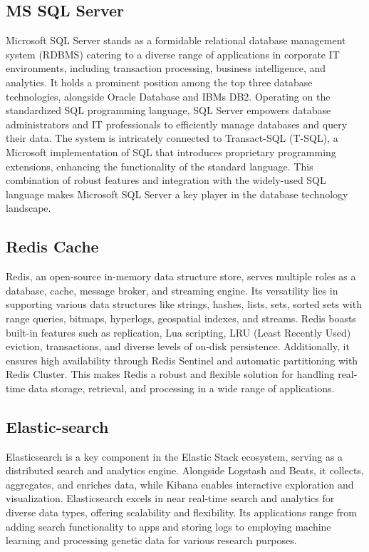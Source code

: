 \subsection{MS SQL Server}

Microsoft SQL Server stands as a formidable relational database
management system (RDBMS) catering to a diverse range of applications in
corporate IT environments, including transaction processing, business
intelligence, and analytics. It holds a prominent position among the top
three database technologies, alongside Oracle Database and
IBM\textquotesingle s DB2. Operating on the standardized SQL programming
language, SQL Server empowers database administrators and IT
professionals to efficiently manage databases and query their data. The
system is intricately connected to Transact-SQL (T-SQL), a Microsoft
implementation of SQL that introduces proprietary programming
extensions, enhancing the functionality of the standard language. This
combination of robust features and integration with the widely-used SQL
language makes Microsoft SQL Server a key player in the database
technology landscape.


\subsection{Redis Cache}

Redis, an open-source in-memory data structure store, serves multiple
roles as a database, cache, message broker, and streaming engine. Its
versatility lies in supporting various data structures like strings,
hashes, lists, sets, sorted sets with range queries, bitmaps, hyperlogs,
geospatial indexes, and streams. Redis boasts built-in features such as
replication, Lua scripting, LRU (Least Recently Used) eviction,
transactions, and diverse levels of on-disk persistence. Additionally,
it ensures high availability through Redis Sentinel and automatic
partitioning with Redis Cluster. This makes Redis a robust and flexible
solution for handling real-time data storage, retrieval, and processing
in a wide range of applications.


\subsection{Elastic-search}

Elasticsearch is a key component in the Elastic Stack ecosystem, serving
as a distributed search and analytics engine. Alongside Logstash and
Beats, it collects, aggregates, and enriches data, while Kibana enables
interactive exploration and visualization. Elasticsearch excels in near
real-time search and analytics for diverse data types, offering
scalability and flexibility. Its applications range from adding search
functionality to apps and storing logs to employing machine learning and
processing genetic data for various research purposes.

